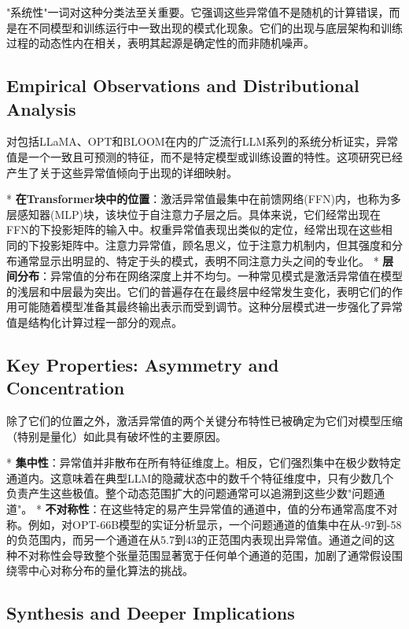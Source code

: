 \documentclass{article}
\begin{document}
"系统性"一词对这种分类法至关重要。它强调这些异常值不是随机的计算错误，而是在不同模型和训练运行中一致出现的模式化现象。它们的出现与底层架构和训练过程的动态性内在相关，表明其起源是确定性的而非随机噪声。

\subsection{Empirical Observations and Distributional Analysis}

对包括LLaMA、OPT和BLOOM在内的广泛流行LLM系列的系统分析证实，异常值是一个一致且可预测的特征，而不是特定模型或训练设置的特性。这项研究已经产生了关于这些异常值倾向于出现的详细映射。

* \textbf{在Transformer块中的位置}：激活异常值最集中在前馈网络(FFN)内，也称为多层感知器(MLP)块，该块位于自注意力子层之后。具体来说，它们经常出现在FFN的下投影矩阵的输入中。权重异常值表现出类似的定位，经常出现在这些相同的下投影矩阵中。注意力异常值，顾名思义，位于注意力机制内，但其强度和分布通常显示出明显的、特定于头的模式，表明不同注意力头之间的专业化。
* \textbf{层间分布}：异常值的分布在网络深度上并不均匀。一种常见模式是激活异常值在模型的浅层和中层最为突出。它们的普遍存在在最终层中经常发生变化，表明它们的作用可能随着模型准备其最终输出表示而受到调节。这种分层模式进一步强化了异常值是结构化计算过程一部分的观点。

\subsection{Key Properties: Asymmetry and Concentration}

除了它们的位置之外，激活异常值的两个关键分布特性已被确定为它们对模型压缩（特别是量化）如此具有破坏性的主要原因。

* \textbf{集中性}：异常值并非散布在所有特征维度上。相反，它们强烈集中在极少数特定通道内。这意味着在典型LLM的隐藏状态中的数千个特征维度中，只有少数几个负责产生这些极值。整个动态范围扩大的问题通常可以追溯到这些少数"问题通道"。
* \textbf{不对称性}：在这些特定的易产生异常值的通道中，值的分布通常高度不对称。例如，对OPT-66B模型的实证分析显示，一个问题通道的值集中在从-97到-58的负范围内，而另一个通道在从5.7到43的正范围内表现出异常值。通道之间的这种不对称性会导致整个张量范围显著宽于任何单个通道的范围，加剧了通常假设围绕零中心对称分布的量化算法的挑战。

\subsection{Synthesis and Deeper Implications}
\end{document}
